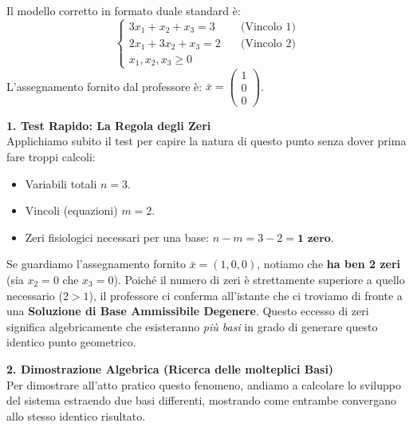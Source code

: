 \documentclass[12pt, a4paper]{article}
\begin{document}
	Il modello corretto in formato duale standard è:
	\[
	\begin{cases}
		3x_1 + x_2 + x_3 = 3 \quad &\text{(Vincolo 1)} \\
		2x_1 + 3x_2 + x_3 = 2 \quad &\text{(Vincolo 2)} \\
		x_1, x_2, x_3 \geq 0
	\end{cases}
	\]
	L'assegnamento fornito dal professore è: $\bar{x} = \begin{pmatrix} 1 \\ 0 \\ 0 \end{pmatrix}$.
	
	\vspace{0.4cm}
	\textbf{1. Test Rapido: La Regola degli Zeri}\\
	Applichiamo subito il test per capire la natura di questo punto senza dover prima fare troppi calcoli:
	\begin{itemize}[label=\textcolor{titlecolor}{\Large\textbullet}, itemsep=2pt, leftmargin=1.5cm]
		\item Variabili totali $n = 3$.
		\item Vincoli (equazioni) $m = 2$.
		\item Zeri fisiologici necessari per una base: $n - m = 3 - 2 = \textbf{1 zero}$.
	\end{itemize}
	Se guardiamo l'assegnamento fornito $\bar{x} = (1, 0, 0)$, notiamo che \textbf{ha ben 2 zeri} (sia $x_2 = 0$ che $x_3 = 0$). 
	Poiché il numero di zeri è strettamente superiore a quello necessario ($2 > 1$), il professore ci conferma all'istante che ci troviamo di fronte a una \textbf{Soluzione di Base Ammissibile Degenere}. Questo eccesso di zeri significa algebricamente che esisteranno \textit{più basi} in grado di generare questo identico punto geometrico.
	
	\vspace{0.4cm}
	\textbf{2. Dimostrazione Algebrica (Ricerca delle molteplici Basi)}\\
	Per dimostrare all'atto pratico questo fenomeno, andiamo a calcolare lo sviluppo del sistema estraendo due basi differenti, mostrando come entrambe convergano allo stesso identico risultato.
	
\end{document}
